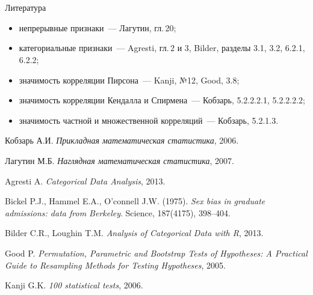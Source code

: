 \documentclass[9pt,pdf,utf8,hyperref={unicode},aspectratio=169]{beamer}
\begin{document}
\section{}
\begin{frame}{Литература}
	\begin{itemize}
		\item непрерывные признаки~--- Лагутин, гл.\,20;
		\item категориальные признаки~--- Agresti, гл.\,2 и 3, Bilder, разделы 3.1, 3.2, 6.2.1, 6.2.2;
		\item значимость корреляции Пирсона~--- Kanji, №12, Good, 3.8;
		\item значимость корреляции Кендалла и Спирмена~--- Кобзарь, 5.2.2.2.1, 5.2.2.2.2;
		\item значимость частной и множественной корреляций~--- Кобзарь, 5.2.1.3.
	\end{itemize}
	
	\bigskip
	
	{\small
		Кобзарь А.И. \textit{Прикладная математическая статистика}, 2006.
		
		\vspace{5pt}
		    	
		Лагутин М.Б. \textit{Наглядная математическая статистика}, 2007.
		
		\vspace{5pt}
		    	
		Agresti A. \textit{Categorical Data Analysis}, 2013.
		
		\vspace{5pt}
		    	
		Bickel P.J., Hammel E.A., O’connell J.W. (1975). \textit{Sex bias in graduate admissions: data from Berkeley}. Science, 187(4175), 398–404. 
		
		\vspace{5pt}
		    			
		Bilder C.R., Loughin T.M. \textit{Analysis of Categorical Data with R}, 2013.
		
		\vspace{5pt}
		    	
		Good P. \textit{Permutation, Parametric and Bootstrap Tests of Hypotheses: A Practical Guide to Resampling Methods for Testing Hypotheses}, 2005.
		
		\vspace{5pt}
		    	
		Kanji G.K. \textit{100 statistical tests}, 2006.
%		
%		    	

	}
\end{frame}
\end{document}
